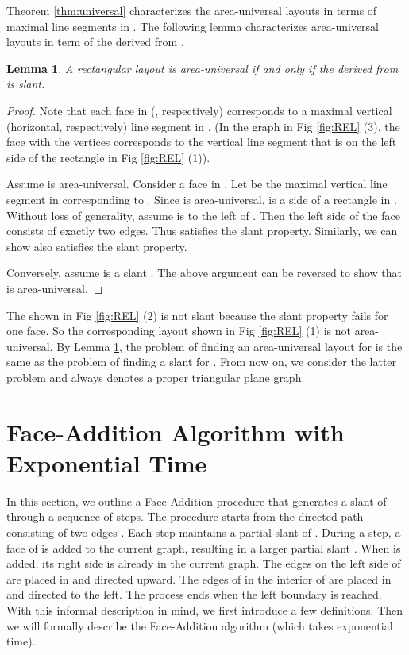 \documentclass[11pt]{article}
\newtheorem{lemma}[figure]{Lemma}
\begin{document}
Theorem \ref{thm:universal} characterizes the area-universal layouts in terms
of maximal line segments in . The following lemma characterizes
area-universal layouts in term of the  derived from .

\begin{lemma}\label{lemma:slant}
A rectangular layout  is area-universal if and
only if the   derived from  is slant.
\end{lemma}
\begin{proof}
Note that each face in  (, respectively) corresponds
to a maximal vertical (horizontal, respectively) line
segment in . (In the graph  in Fig
\ref{fig:REL} (3), the face  with the vertices 
corresponds to the vertical line segment that is on the left side
of the rectangle  in Fig \ref{fig:REL} (1)).

Assume  is area-universal. Consider a face  in . Let
 be the maximal vertical line segment in  corresponding to
. Since  is area-universal,  is a side of a rectangle
 in . Without loss of generality, assume  is to the left
of . Then the left side of the face  consists
of exactly two edges. Thus  satisfies the slant property.
Similarly, we can show  also satisfies the slant property.

Conversely, assume  is a slant . The above argument can be
reversed to show that  is area-universal.
\end{proof}

The  shown in Fig \ref{fig:REL} (2) is not slant because
the slant property fails for one  face.
So the corresponding layout shown in Fig \ref{fig:REL} (1)
is not area-universal. By Lemma \ref{lemma:slant}, the problem of
finding an area-universal layout for  is the same as the problem
of finding a slant  for . From now on, we consider the
latter problem and  always denotes a proper triangular plane graph.

\section{Face-Addition Algorithm with Exponential Time}\label{sec:outline}

In this section, we outline a Face-Addition procedure that generates
a slant   of  through a sequence of steps.
The procedure starts from the directed path consisting of two edges
. Each step maintains a partial
slant  of . During a step, a face  of  is added to the
current graph, resulting in a larger partial slant . When  is
added, its right side is already in the current graph. The edges on the
left side of  are placed in  and directed upward. The edges
of  in the interior of  are placed in  and directed to the
left. The process ends when the left boundary  is reached. With this informal description in mind,
we first introduce a few definitions. Then we will formally
describe the Face-Addition algorithm (which takes exponential time).
\end{document}
